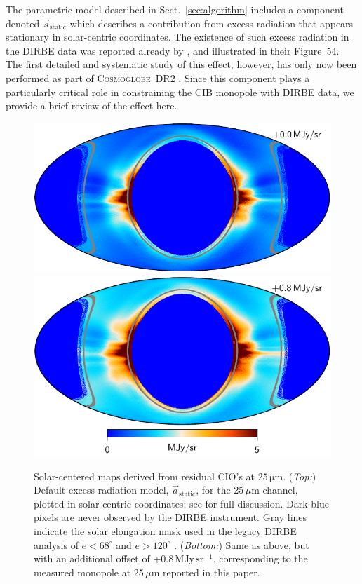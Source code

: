 \documentclass{aa}
\newcommand{\s}[0]{\vec{s}}
\renewcommand{\a}[0]{\vec{a}}
\newcommand{\cosmoglobe}{\textsc{Cosmoglobe}}
\begin{document}
The parametric model described in Sect.~\ref{sec:algorithm} includes a
component denoted $\s_{\mathrm{static}}$ which describes a
contribution from excess radiation that appears stationary in
solar-centric coordinates. The existence of such excess radiation in
the DIRBE data was reported already by \citet{leinert:1998}, and
illustrated in their Figure~54. The first detailed and systematic
study of this effect, however, has only now been performed as part of
\cosmoglobe\ DR2 \citep{CG02_01}. Since this component plays a
particularly critical role in constraining the CIB monopole with DIRBE
data, we provide a brief review of the effect here.

\begin{figure}
  \centering
  \includegraphics[width=\linewidth]{figs/solarmap_06_v1_mono0.pdf}\\
  \includegraphics[width=\linewidth]{figs/solarmap_06_v1_mono8.pdf}
	\caption{Solar-centered maps derived from residual CIO's at $25\,\mathrm{\mu m}$. (\emph{Top:}) Default excess radiation model, $\a_{\mathrm{static}}$, for the 25\,$\mu$m channel, plotted in solar-centric coordinates; see \citet{CG02_01} for full discussion. Dark blue pixels are never observed by the DIRBE instrument. Gray lines indicate the solar elongation mask used in the legacy DIRBE analysis of $e < 68^{\circ}$ and $e >120^{\circ}$ \citep{kelsall1998}. (\emph{Bottom:}) Same as above, but with an additional offset of +0.8\,$\mathrm{MJy\,sr^{-1}}$, corresponding to the measured monopole at 25\,$\mu$m reported in this paper.}
  \label{fig:sidelobe}
\end{figure}
\end{document}
